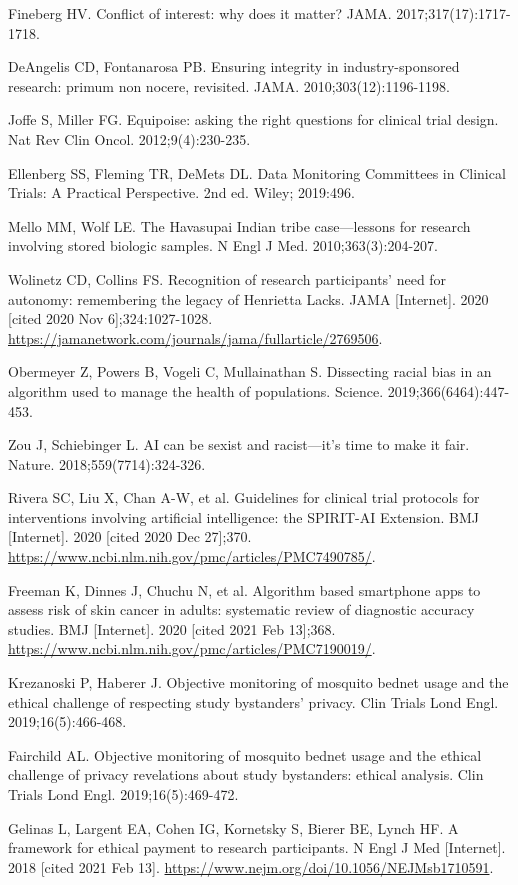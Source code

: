 \begin{references}
\item Fineberg HV. Conflict of interest: why does it matter? JAMA. 2017;317(17):1717-1718.
\item DeAngelis CD, Fontanarosa PB. Ensuring integrity in industry-sponsored research: primum non nocere, revisited. JAMA. 2010;303(12):1196-1198.
\item Joffe S, Miller FG. Equipoise: asking the right questions for clinical trial design. Nat Rev Clin Oncol. 2012;9(4):230-235.
\item Ellenberg SS, Fleming TR, DeMets DL. Data Monitoring Committees in Clinical Trials: A Practical Perspective. 2nd ed. Wiley; 2019:496.
\item Mello MM, Wolf LE. The Havasupai Indian tribe case—lessons for research involving stored biologic samples. N Engl J Med. 2010;363(3):204-207.
\item Wolinetz CD, Collins FS. Recognition of research participants’ need for autonomy: remembering the legacy of Henrietta Lacks. JAMA [Internet]. 2020 [cited 2020 Nov 6];324:1027-1028. \url{https://jamanetwork.com/journals/jama/fullarticle/2769506}.
\item Obermeyer Z, Powers B, Vogeli C, Mullainathan S. Dissecting racial bias in an algorithm used to manage the health of populations. Science. 2019;366(6464):447-453.
\item Zou J, Schiebinger L. AI can be sexist and racist—it’s time to make it fair. Nature. 2018;559(7714):324-326.
\item Rivera SC, Liu X, Chan A-W, et al. Guidelines for clinical trial protocols for interventions involving artificial intelligence: the SPIRIT-AI Extension. BMJ [Internet]. 2020 [cited 2020 Dec 27];370. \url{https://www.ncbi.nlm.nih.gov/pmc/articles/PMC7490785/}.
\item Freeman K, Dinnes J, Chuchu N, et al. Algorithm based smartphone apps to assess risk of skin cancer in adults: systematic review of diagnostic accuracy studies. BMJ [Internet]. 2020 [cited 2021 Feb 13];368. \url{https://www.ncbi.nlm.nih.gov/pmc/articles/PMC7190019/}.
\item Krezanoski P, Haberer J. Objective monitoring of mosquito bednet usage and the ethical challenge of respecting study bystanders’ privacy. Clin Trials Lond Engl. 2019;16(5):466-468.
\item Fairchild AL. Objective monitoring of mosquito bednet usage and the ethical challenge of privacy revelations about study bystanders: ethical analysis. Clin Trials Lond Engl. 2019;16(5):469-472.
\item Gelinas L, Largent EA, Cohen IG, Kornetsky S, Bierer BE, Lynch HF. A framework for ethical payment to research participants. N Engl J Med [Internet]. 2018 [cited 2021 Feb 13]. \url{https://www.nejm.org/doi/10.1056/NEJMsb1710591}.
\end{references}
